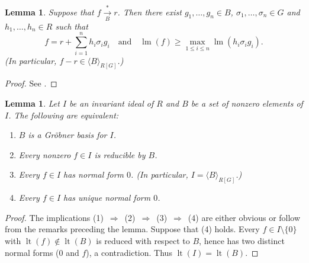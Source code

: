 \documentclass{amsart}
\newtheorem{lemma}[theorem]{Lemma}
\theoremstyle{definition}
\theoremstyle{remark}
\numberwithin{equation}{section}
\newcommand{\lm}{\operatorname{lm}}
\newcommand{\lt}{\operatorname{lt}}
\newcommand{\<}{\langle}
\renewcommand{\>}{\rangle}
\begin{document}
\begin{lemma}\label{reduction}
  Suppose that $f\underset{B}{\overset{*}\longrightarrow} r$. Then
  there exist $g_1,\dots,g_n\in B$, $\sigma_1,\dots,\sigma_n\in G$ and
  $h_1,\dots,h_n\in R$ such that
  $$f=r+\sum_{i=1}^n h_i\sigma_i g_i\quad \text{and}\quad \lm(f)\geq
  \max_{1\leq i\leq n}\lm(h_i\sigma_ig_i).$$
  \textup{(}In particular,
  $f-r\in \<B\>_{R[G]}$.\textup{)}
\end{lemma}
\begin{proof}
See \cite{AH}.
\end{proof}

\begin{lemma}\label{char GB}
  Let $I$ be an invariant ideal of $R$ and $B$ be a set of nonzero
  elements of $I$. The following are equivalent:
\begin{enumerate}
\item $B$ is a Gr\"obner basis for $I$.
\item Every nonzero $f\in I$ is reducible by $B$.
\item Every $f\in I$ has normal form $0$. \textup{(}In particular,
  $I=\<B\>_{R[G]}$.\textup{)}
\item Every $f\in I$ has unique normal form $0$.
\end{enumerate}
\end{lemma}
\begin{proof}
  The implications
  (1)~$\Rightarrow$~(2)~$\Rightarrow$~(3)~$\Rightarrow$~(4) are either
  obvious or follow from the remarks preceding the lemma.  Suppose
  that (4) holds. Every $f\in I\setminus\{0\}$ with
  $\lt(f)\notin\lt(B)$ is reduced with respect to $B$, hence has two
  distinct normal forms ($0$ and $f$), a contradiction. Thus
  $\lt(I)=\lt(B)$.
\end{proof}
\end{document}
